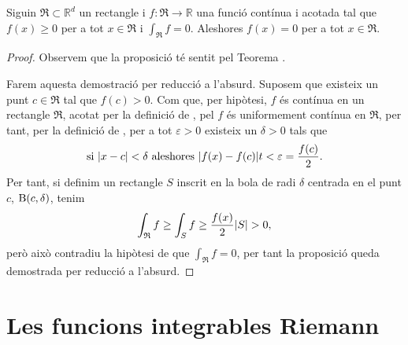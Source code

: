\documentclass[../Apunts.tex]{subfiles}
\begin{document}
	\begin{proposition}
		Siguin \(\mathfrak{R}\subset\mathbb{R}^{d}\) un rectangle i \(f\colon\mathfrak{R}\to\mathbb{R}\) una funció contínua i acotada tal que \(f(x)\geq0\) per a tot \(x\in \mathfrak{R}\) i \(\int_{\mathfrak{R}}f=0\). Aleshores \(f(x)=0\) per a tot \(x\in \mathfrak{R}\).
		\begin{proof}
			Observem que la proposició té sentit pel Teorema .
			
			Farem aquesta demostració per reducció a l'absurd. Suposem que existeix un punt \(c\in \mathfrak{R}\) tal que \(f(c)>0\). Com que, per hipòtesi, \(f\) és contínua en un rectangle \(\mathfrak{R}\), acotat per la definició de , pel  \(f\) és uniformement contínua en \(\mathfrak{R}\), per tant, per la definició de , per a tot \(\varepsilon>0\) existeix un \(\delta>0\) tals que
			\[\text{si }\abs{x-c}<\delta\text{ aleshores }\abs{f(x)-f(c)}t<\varepsilon=\frac{f(c)}{2}.\]
			Per tant, si definim un rectangle \(S\) inscrit en la bola de radi \(\delta\) centrada en el punt \(c\), \(\operatorname{B}(c,\delta)\), tenim %
			\[\int_{\mathfrak{R}}f\geq\int_{S}f\geq\frac{f(x)}{2}\abs{S}>0,\]
			però això contradiu la hipòtesi de que \(\int_{\mathfrak{R}}f=0\), per tant la proposició queda demostrada per reducció a l'absurd.
		\end{proof}
	\end{proposition}
	\section{Les funcions integrables Riemann}
\end{document}
